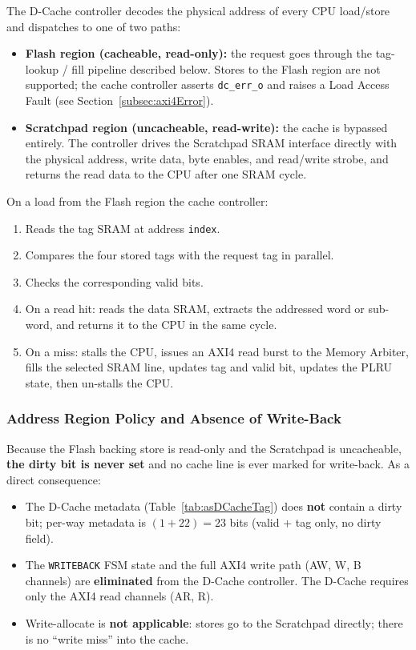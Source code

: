 The D-Cache controller decodes the physical address of every CPU load/store
and dispatches to one of two paths:

\begin{itemize}
  \item \textbf{Flash region (cacheable, read-only):} the request goes
    through the tag-lookup / fill pipeline described below.
    Stores to the Flash region are not supported; the cache controller
    asserts \texttt{dc\_err\_o} and raises a Load Access Fault (see Section~\ref{subsec:axi4Error}).
  \item \textbf{Scratchpad region (uncacheable, read-write):} the cache is
    bypassed entirely.
    The controller drives the Scratchpad SRAM interface directly with the
    physical address, write data, byte enables, and read/write strobe, and
    returns the read data to the CPU after one SRAM cycle.
\end{itemize}

On a load from the Flash region the cache controller:
\begin{enumerate}
  \item Reads the tag SRAM at address \texttt{index}.
  \item Compares the four stored tags with the request tag in parallel.
  \item Checks the corresponding valid bits.
  \item On a read hit: reads the data SRAM, extracts the addressed word or
    sub-word, and returns it to the CPU in the same cycle.
  \item On a miss: stalls the CPU, issues an AXI4 read burst to the Memory
    Arbiter, fills the selected SRAM line, updates tag and valid bit,
    updates the PLRU state, then un-stalls the CPU.
\end{enumerate}

\subsubsection{Address Region Policy and Absence of Write-Back}

Because the Flash backing store is read-only and the Scratchpad is
uncacheable, \textbf{the dirty bit is never set} and no cache line is ever
marked for write-back.
As a direct consequence:

\begin{itemize}
  \item The D-Cache metadata (Table~\ref{tab:asDCacheTag}) does \textbf{not}
    contain a dirty bit; per-way metadata is $(1+22)=23$ bits
    (valid + tag only, no dirty field).
  \item The \texttt{WRITEBACK} FSM state and the full AXI4 write path
    (AW, W, B channels) are \textbf{eliminated} from the D-Cache
    controller.
    The D-Cache requires only the AXI4 read channels (AR, R).
  \item Write-allocate is \textbf{not applicable}: stores go to the
    Scratchpad directly; there is no ``write miss'' into the cache.
\end{itemize}

